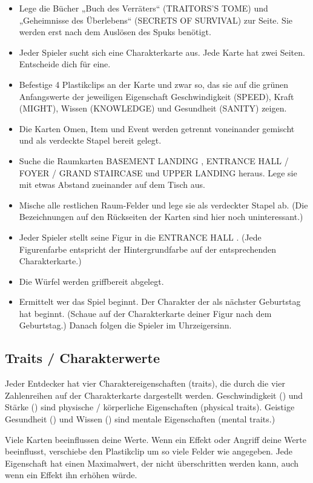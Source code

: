 \begin{itemize}
    \item Lege die Bücher „Buch des Verräters“ (TRAITORS’S TOME) und „Geheimnisse des Überlebens“ (SECRETS OF SURVIVAL) zur Seite. Sie werden erst nach dem Auslösen des Spuks benötigt.
    \item Jeder Spieler sucht sich eine Charakterkarte aus. Jede Karte hat zwei Seiten. Entscheide dich für eine.
    \item Befestige 4 Plastikclips an der Karte und zwar so, das sie auf die grünen Anfangswerte der jeweiligen Eigenschaft Geschwindigkeit (SPEED), Kraft (MIGHT), Wissen (KNOWLEDGE) und Gesundheit (SANITY) zeigen.
    \item Die Karten Omen, Item und Event werden getrennt voneinander gemischt und als verdeckte Stapel bereit gelegt.
    \item Suche die Raumkarten BASEMENT LANDING , ENTRANCE HALL / FOYER / GRAND STAIRCASE und UPPER LANDING heraus. Lege sie mit etwas Abstand zueinander auf dem Tisch aus.
    \item Mische alle restlichen Raum-Felder und lege sie als verdeckter Stapel ab. (Die Bezeichnungen auf den Rückseiten der Karten sind hier noch uninteressant.)
    \item Jeder Spieler stellt seine Figur in die ENTRANCE HALL . (Jede Figurenfarbe entspricht der Hintergrundfarbe auf der entsprechenden Charakterkarte.)
    \item Die Würfel werden griffbereit abgelegt.
    \item Ermittelt wer das Spiel beginnt. Der Charakter der als nächster Geburtstag hat beginnt. (Schaue auf der Charakterkarte deiner Figur nach dem Geburtstag.) Danach folgen die Spieler im Uhrzeigersinn.
\end{itemize}


\subsection{Traits / Charakterwerte}

Jeder Entdecker hat vier Charaktereigenschaften (traits), die durch die vier Zahlenreihen auf der Charakterkarte dargestellt werden. Geschwindigkeit (\speed) und Stärke (\might) sind physische / körperliche Eigenschaften (physical traits). Geistige Gesundheit (\sanity) und Wissen (\know) sind mentale Eigenschaften (mental traits.)

Viele Karten beeinflussen deine Werte. Wenn ein Effekt oder Angriff deine Werte beeinflusst, verschiebe den Plastikclip um so viele Felder wie angegeben. Jede Eigenschaft hat einen Maximalwert, der nicht überschritten werden kann, auch wenn ein Effekt ihn erhöhen würde.

